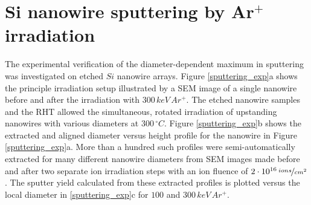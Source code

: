 



\section{Si nanowire sputtering by Ar$^+$ irradiation}
\label{sec:sisputtering}

The experimental verification of the diameter-dependent maximum in sputtering was investigated on etched $Si$ nanowire arrays. Figure \ref{sputtering_exp}a shows the principle irradiation setup illustrated by a SEM image of a single nanowire before and after the irradiation with $300\,keV\,Ar^+$. The etched nanowire samples and the RHT allowed the simultaneous, rotated irradiation of upstanding nanowires with various diameters at $300\,^\circ C$. Figure \ref{sputtering_exp}b shows the extracted and aligned diameter versus height profile for the nanowire in Figure \ref{sputtering_exp}a. More than a hundred such profiles were semi-automatically extracted for many different nanowire diameters from SEM images made before and after two separate ion irradiation steps with an ion fluence of $2\cdot10^{16}\,\nicefrac{ions}{cm^2}$. The sputter yield calculated from these extracted profiles is plotted versus the local diameter in \ref{sputtering_exp}c for $100$ and $300\,keV\,Ar^+$.

